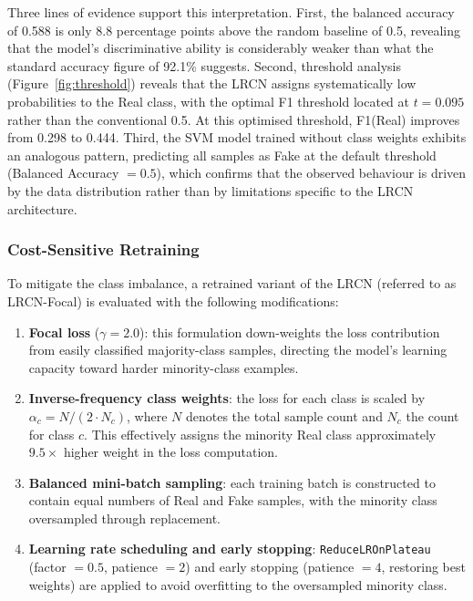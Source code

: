 Three lines of evidence support this interpretation. First, the balanced accuracy of 0.588 is only 8.8 percentage points above the random baseline of 0.5, revealing that the model's discriminative ability is considerably weaker than what the standard accuracy figure of 92.1\% suggests. Second, threshold analysis (Figure~\ref{fig:threshold}) reveals that the LRCN assigns systematically low probabilities to the Real class, with the optimal F1 threshold located at $t = 0.095$ rather than the conventional 0.5. At this optimised threshold, F1(Real) improves from 0.298 to 0.444. Third, the SVM model trained without class weights exhibits an analogous pattern, predicting all samples as Fake at the default threshold (Balanced Accuracy $= 0.5$), which confirms that the observed behaviour is driven by the data distribution rather than by limitations specific to the LRCN architecture.

\subsubsection*{Cost-Sensitive Retraining}

To mitigate the class imbalance, a retrained variant of the LRCN (referred to as LRCN-Focal) is evaluated with the following modifications:

\begin{enumerate}
    \item \textbf{Focal loss} ($\gamma = 2.0$): this formulation down-weights the loss contribution from easily classified majority-class samples, directing the model's learning capacity toward harder minority-class examples.
    \item \textbf{Inverse-frequency class weights}: the loss for each class is scaled by $\alpha_c = N / (2 \cdot N_c)$, where $N$ denotes the total sample count and $N_c$ the count for class $c$. This effectively assigns the minority Real class approximately $9.5\times$ higher weight in the loss computation.
    \item \textbf{Balanced mini-batch sampling}: each training batch is constructed to contain equal numbers of Real and Fake samples, with the minority class oversampled through replacement.
    \item \textbf{Learning rate scheduling and early stopping}: \texttt{ReduceLROnPlateau} (factor $= 0.5$, patience $= 2$) and early stopping (patience $= 4$, restoring best weights) are applied to avoid overfitting to the oversampled minority class.
\end{enumerate}

